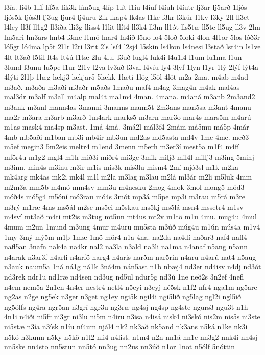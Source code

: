 {l3ía.
lí4b
1líf
líf5a
lík3k
lím5ug
4líp
1lít
l1íu
l4íuf
l4íuh
l4íutr
lj3ar
lj5arð
1ljós
ljós5k
ljós3l
lj3ug
ljur4
lj4uru
2lk
lkap4
lk4as
l1ke
l3kr
l3kúr
l1kv
l3ky
2ll
ll3et
l4ley
ll3f
ll1g2
ll3iða
lli3g
lliss4
l1lit
llít4
ll3k4
ll3m
ll1ót
lls5tæ
ll5te
ll5ug
ll3v
2lm
lm5ari
lm3ars
lmb4
l3me
l1mó
lnar4
ln4ið
l5no
lo4
5loð
5loki
4lon
4l1or
5los
lóð3r
ló5gr
ló4ma
lp5t
2l1r
l2ri
l3rit
2ls
lsí4
l2sj4
l5skin
ls4kon
ls4nesi
l3stað
lst4in
ls1ve
4lt
lt3að
l5til
lt4s
lt4ú
l1tæ
2lu
4lu.
l3uð
lugl4
luk4i
l4u1l4
l1um
lu1ma
l1un
3lund
l3unu
lu5pe
l1ur
2l1v
l2va
lv3að
l3val
l4víu
ly4
3lyf
1lyn
l1yr
1lý
2lýf
lýt4a
4lýti
2l1þ
1læg
lækj3
lækjar5
5lækk
1læti
1lög
l5öl
4löt
m2a
2ma.
m4ab
m4ad
m3að.
m3aða
m3aði
m3aðr
m5aðs
1maðu
maf4
m4ag
3mag4n
m4ak
mal4as
mal3dr
m3alf
m3all
m4alp
mal4t
ma1m4
4man.
4mana.
m4aná
m3anb
2m3and2
m3ank
m3anl
mann4as
3manni
3manns
mann5t
2m3ans
man5sa
m3ant
4manu
ma2r
m3ara
m3arb
m3arð
1m4ark
marks5
m3arn
mar3o
mar4s
mars5m
m4arú
m1as
mask4
ma4sp
m3ast.
1má
4má.
3má2l
mál3f4
2mám
má5mu
má5p
4már
4mb
mb5aði
m1ban
mb3i
mb4ir
mb3un
md2as
md5asta
md4v
1me
4me.
með3
m5ef
megin3
5m2eis
meltr4
m1end
3menn
m5erh
m3er3í
mest5a
m1f4
m4fí
mför4u
m1g2
mgl4
m1h
mið3i
miðr4
mi3ge
3mik
milj3
mil4l
millj3
m3ing
5minj
m3inn.
min4s
m3inu
m3ir
m1is
mis3k
mis3lu
mism4
2mí
mjó3sl
m1k
m2ka
mk4arg
mk4as
mk2i
mk4l
m1l
m2la
m3lag
m3lau
m2lá
ml3ár
m2li
m5luk
4mm
m2m3a
mm5b
m4mó
mm4sv
mm3u
m4nesku
2mog
4mok
3mol
mong5
mód3
móð4s
mó5g4
m5óní
mó3rau
mó4s
3mót
mp3á
m5pe
mp3i
m3rau
m5rá
m3re
m3rý
m1ræ
4ms
ms5ál
m2se
ms5ei
m5skau
ms5kj
ms5lá
msn4
mssetr4
m1sv
m4sví
mt3að
m4ti
mt2is
m3tug
mt5un
mt4us
mt2v
m1tö
m1u
4mu.
mug4u
4mul
4mum
m2un
1mund
m3ung
4mur
m4uru
mu5sta
m3úð
múg4u
m1ún
mús4a
m1v4
1my
3mý
mý5m
m1þ
1mæ
1mö
mör4
n1a
4na.
na2da
na4dí
naðar3
naf4
nafl4
nafl5an
3nafn
nak4a
na4kr
nal2
na3la
n3ald
na3li
na1ma
n4anaf
n5ang
n5ann
n4arak
n3ar3f
n4arfi
n4arfö
narg4
n4aris
nar5m
nar5rin
n4aru
n4arú
nat4
n5aug
n3auk
naum5a
1ná
ná1g
ná1k
3ná4m
nán5ast
n1b
nbæj4
nd3er
nd4isv
n4dj
nd3ót
nd3rek
ndr1u
nd1ræ
nd4sen
nd3ug
nd5ul
ndur5g
nd3ú
1ne
neð2s
3n2ef
4nefl
n4em
nem5a
2n1en
4n4er
nestr4
netl4
n5eyi
n3eyj
né5sk
n1f2
nfr4
nga1m
ng5are
ng2as
n2ge
ng5ek
n3ger
n3get
ng1ey
ngi5k
ngil4i
ngi5lið
ng5lag
ngl2i
ngl5ið
ng5ólfs
ng4ra
ngr5an
n3grí
ngr3u
ng3ræ
ng4sj
ng4sp
ng4ste
ngurs3
ngu3t
n1h
4n1i
n4iði
ni5fr
ni3gr
ni3lu
ni5m
n4iru
n3isa
n4isá
nisk4
ni3skó
nis2m
nis5s
ni3ste
ni5stæ
n3ía
n3ísk
n1íu
ní4um
njál4
nk2
nk3að
nk5and
nk3ans
n5ká
n1ke
nk3i
n5kó
n3kunn
n5ky
n5kö
n1l2
nli4
n4list.
n1m4
n2n
nn1á
nn1e
nn3g2
nnk4i
nn4sj
nn5ske
nn4sto
nn5stun
nn5tó
nn3ug
nn2us
nn3úð
n1or
1not
n5ólf
5nóttin
}
